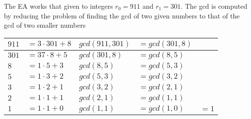 \noindent
The EA works that given to integers $r_0 = 911$ and $r_1 = 301$. The gcd is computed by reducing the problem of finding the gcd of two given numbers to that of the gcd of two smaller numbers 


\begin{center}
\begin{tabular}{|ll|lll| } 
\hline
$911$ & $= 3 \cdot 301 +8$& $gcd(911,301)$ & $= gcd(301,8)$ & \\ 
\hline
$301$ & $= 37 \cdot 8+5$ & $gcd(301,8)$ & $= gcd(8,5)$ &\\ 
\hline
$8$ & $= 1 \cdot 5+3$ & $gcd(8,5)$ & $= gcd(5,3)$ & \\ 
\hline
$5$ & $= 1 \cdot 3+2$ & $gcd(5,3)$ & $= gcd(3,2)$ & \\ 
\hline
$3$ & $= 1 \cdot 2+1$ & $gcd(3,2)$ & $= gcd(2,1)$ & \\ 
\hline
$2$ & $= 1 \cdot 1+1$ & $gcd(2,1)$ & $= gcd(1,1)$ & \\ 
\hline
$1$ & $= 1 \cdot 1+0$ & $gcd(1,1)$ & $= gcd(1,0)$ & $= 1$ \\ 
\hline
\end{tabular}
\end{center}


